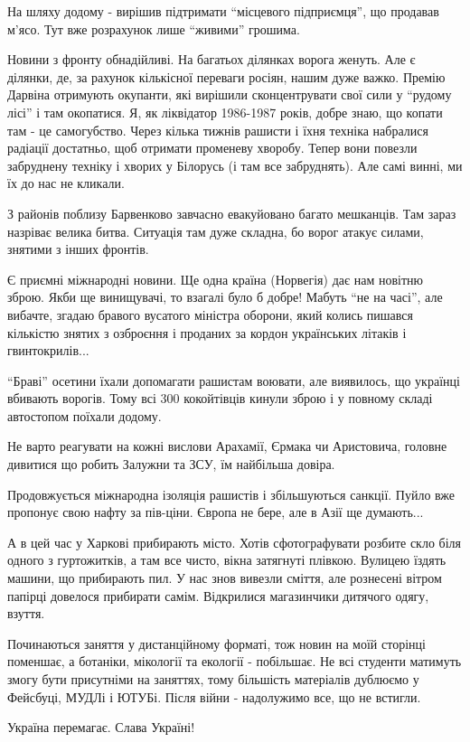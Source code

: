 На шляху додому - вирішив підтримати \enquote{місцевого підприємця}, що продавав м'ясо.
Тут вже розрахунок лише \enquote{живими} грошима.

Новини з фронту обнадійливі. На багатьох ділянках ворога женуть. Але є ділянки,
де, за рахунок кількісної переваги росіян, нашим дуже важко. Премію Дарвіна
отримують окупанти, які вирішили сконцентрувати свої сили у \enquote{рудому лісі} і там
окопатися. Я, як ліквідатор 1986-1987 років, добре знаю, що копати там - це
самогубство. Через кілька тижнів рашисти і їхня техніка набралися радіації
достатньо, щоб отримати променеву хворобу. Тепер вони повезли забруднену
техніку і хворих у Білорусь (і там все забруднять). Але  самі винні, ми їх до
нас не кликали.

З районів поблизу Барвенково завчасно евакуйовано багато мешканців. Там зараз
назріває велика битва. Ситуація там дуже складна, бо ворог атакує силами,
знятими з інших фронтів.

Є приємні міжнародні новини. Ще одна країна (Норвегія) дає нам новітню зброю.
Якби ще винищувачі, то взагалі було б добре! Мабуть \enquote{не на часі}, але вибачте,
згадаю бравого вусатого міністра оборони, який колись пишався кількістю знятих
з озброєння і проданих за кордон українських літаків і гвинтокрилів...

\enquote{Браві} осетини їхали допомагати рашистам воювати, але виявилось, що українці
вбивають ворогів. Тому всі 300 кокойтівців кинули зброю і у повному складі
автостопом поїхали додому.

Не варто реагувати на кожні вислови Арахамії, Єрмака чи Аристовича, головне
дивитися що робить Залужни та ЗСУ, їм найбільша довіра.

Продовжується міжнародна ізоляція рашистів і збільшуються санкції. Пуйло вже
пропонує свою нафту за пів-ціни. Європа не бере, але в Азії ще думають...

А в цей час у Харкові прибирають місто. Хотів сфотографувати розбите скло біля
одного з гуртожитків, а там все чисто, вікна затягнуті плівкою. Вулицею їздять
машини, що прибирають пил. У нас знов вивезли сміття, але рознесені вітром
папірці довелося прибирати самім. Відкрилися магазинчики дитячого одягу,
взуття.

Починаються заняття у дистанційному форматі, тож новин на моїй сторінці
поменшає, а ботаніки, мікології та екології - побільшає. Не всі студенти
матимуть змогу бути присутніми на заняттях, тому більшість матеріалів дублюємо
у Фейсбуці, МУДЛі і ЮТУБі. Після війни - надолужимо все, що не встигли.

Україна перемагає. Слава Україні!

